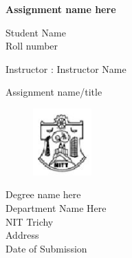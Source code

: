 \documentclass{article}
\begin{document}
\begin{titlepage}
    \begin{center}
        \vspace*{1cm}
        
        \LARGE {\textbf{Assignment name here}}
        
        \vspace{0.5cm}
        
        \vspace{1.0cm}
        
        Student Name\\
        Roll number
        
        \vspace{0.5cm}
        
        Instructor : Instructor Name\\
        
        \vfill
        
        Assignment name/title \\
        
        \vspace{0.4cm}
            
             
            \begin{figure}
  

        \begin{center}   
            \includegraphics[width=0.2\textwidth]{Logo.JPG}
        \end{center}
            \end{figure}
            
        
        Degree name here\\
        Department Name Here\\
        NIT Trichy\\
        Address\\
        Date of Submission
        
    \end{center}
 \end{titlepage}
\end{document}
